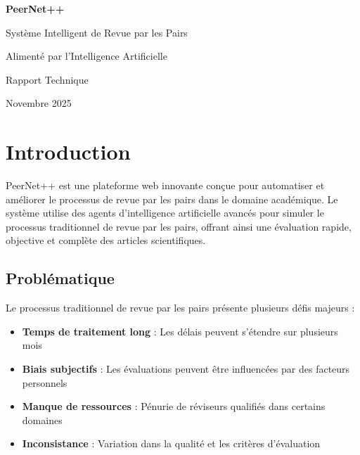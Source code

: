 \documentclass[12pt,a4paper]{article}
\begin{document}
\begin{titlepage}
    \centering
    \vspace*{2cm}
    
    {\Huge\bfseries\color{primaryblue} PeerNet++\par}
    \vspace{1cm}
    {\Large\color{accentgold} Système Intelligent de Revue par les Pairs\par}
    {\Large\color{accentgold} Alimenté par l'Intelligence Artificielle\par}
    
    \vspace{2cm}
    
    {\large Rapport Technique\par}
    
    \vfill
    
    {\large Novembre 2025\par}
\end{titlepage}

\tableofcontents
\newpage

\section{Introduction}

PeerNet++ est une plateforme web innovante conçue pour automatiser et améliorer le processus de revue par les pairs dans le domaine académique. Le système utilise des agents d'intelligence artificielle avancés pour simuler le processus traditionnel de revue par les pairs, offrant ainsi une évaluation rapide, objective et complète des articles scientifiques.

\subsection{Problématique}

Le processus traditionnel de revue par les pairs présente plusieurs défis majeurs :
\begin{itemize}
    \item \textbf{Temps de traitement long} : Les délais peuvent s'étendre sur plusieurs mois
    \item \textbf{Biais subjectifs} : Les évaluations peuvent être influencées par des facteurs personnels
    \item \textbf{Manque de ressources} : Pénurie de réviseurs qualifiés dans certains domaines
    \item \textbf{Inconsistance} : Variation dans la qualité et les critères d'évaluation
\end{itemize}
\end{document}
